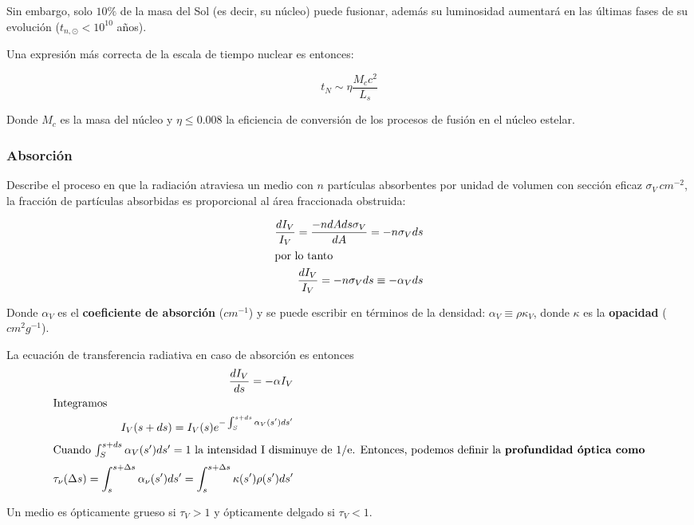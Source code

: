 \documentclass[11pt,letterpaper]{article}
\begin{document}
Sin embargo, solo $10\%$ de la masa del Sol (es decir, su núcleo) puede fusionar, además su luminosidad aumentará en las últimas fases de su evolución ($t_{n, \odot} < 10^{10}$ años).

Una expresión más correcta de la escala de tiempo nuclear es entonces:

\begin{equation}
    t_N \sim \eta \frac{M_c c^2}{L_s}
\end{equation}

Donde $M_c$ es la masa del núcleo y $\eta \le 0.008$ la eficiencia de conversión de los procesos de fusión en el núcleo estelar.

\subsubsection{Absorción}

Describe el proceso en que la radiación atraviesa un medio con $n$ partículas absorbentes por unidad de volumen con sección eficaz $\sigma _V \, cm^{-2}$, la fracción de partículas absorbidas es proporcional al área fraccionada obstruida:

\begin{align}
    \frac{dI_V}{I_V} = \frac{-ndAds \sigma_V}{dA} = -n \sigma _V ds \\
    \intertext{por lo tanto}
    \frac{dI_V}{I_V} = -n \sigma _V ds \equiv - \alpha _V ds
\end{align}

Donde $\alpha_V$ es el \textbf{coeficiente de absorción} ($cm^{-1}$) y se puede escribir en términos de la densidad: $\alpha _V \equiv \rho \kappa _V$, donde $\kappa$ es la \textbf{opacidad} ($cm^2g^{-1}$).

La ecuación de transferencia radiativa en caso de absorción es entonces
\begin{align}
    \frac{dI_V}{ds} = - \alpha I_V \\
    \intertext{Integramos}
    I_V (s + ds) = I_V (s)e^{-\int ^{s+ds} _S \alpha _V (s')ds'} \\
    \intertext{Cuando $\int ^{s+ds} _S \alpha _V (s')ds' = 1$ la intensidad I disminuye de 1/e. Entonces, podemos definir la \textbf{profundidad óptica como}}
    \tau_\nu(\Delta s) = \int_{s}^{s+\Delta s} \alpha_\nu(s') ds' = \int_{s}^{s+\Delta s} \kappa(s') \rho(s') ds'
\end{align}

Un medio es ópticamente grueso si $\tau _V > 1$ y ópticamente delgado si $\tau _V < 1$.
\end{document}
